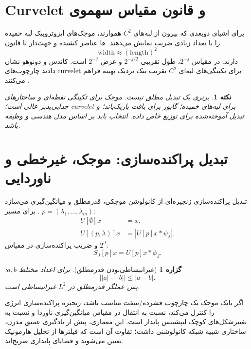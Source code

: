 \documentclass[12pt,openany,oneside]{book}
\newtheorem{proposition}{گزاره}[chapter]
\newtheorem{remark}{نکته}[chapter]
\begin{document}
\section{Curvelet و قانون مقیاس سهموی}

برای اشیای دوبعدی که بیرون از لبه‌های \(C^2\) هموارند، موجک‌های ایزوتروپیک لبه خمیده را با تعداد زیادی
ضریب نمایش می‌دهند. ها عناصر کشیده و جهت‌دار با قانون
\begin{equation}
\text{width}\approx(\text{length})^2
\end{equation}
دارند. در مقیاس \(2^{-j}\)، طول تقریبی \(2^{-j/2}\) و عرض \(2^{-j}\) است. کاندس و دونوهو نشان دادند
چارچوب‌های curvelet برای تکینگی‌های لبه‌ای \(C^2\) تقریب تنک نزدیک بهینه فراهم می‌کنند
\cite{candes2004curvelet}.

\begin{remark}
برتری یک تبدیل مطلق نیست. موجک برای تکینگی نقطه‌ای و ساختارهای جدایی‌پذیر عالی است؛ curvelet برای
لبه‌های خمیده؛ گابور برای بافت باریک‌باند؛ و تبدیل آموخته‌شده برای توزیع خاص داده. انتخاب باید بر اساس
مدل هندسی و وظیفه باشد.
\end{remark}

\section{تبدیل پراکنده‌سازی: موجک، غیرخطی و ناوردایی}

تبدیل پراکنده‌سازی  زنجیره‌ای از کانولوشن موجکی، قدرمطلق و میانگین‌گیری می‌سازد
\cite{mallat2012scattering}. برای مسیر \(p=(\lambda_1,\dots,\lambda_m)\):
\begin{equation}
\begin{aligned}
U[\emptyset]x&=x,\\
U[(p,\lambda)]x&=\left|U[p]x*\psi_{\lambda}\right|.
\end{aligned}
\end{equation}
و ضریب پراکنده‌سازی در مقیاس \(2^J\):
\begin{equation}
S_J[p]x=U[p]x*\phi_J.
\end{equation}

\begin{proposition}[غیرانبساطی‌بودن قدرمطلق]
برای اعداد مختلط \(a,b\):
\begin{equation}
\big||a|-|b|\big|\le|a-b|.
\end{equation}
پس عملگر قدرمطلق در \(L^2\) غیرانبساطی است.
\end{proposition}

اگر بانک موجک یک چارچوب فشرده/سفت مناسب باشد، زنجیره پراکنده‌سازی انرژی را کنترل می‌کند، نسبت به انتقال
در مقیاس میانگین‌گیری ناوردا و نسبت به تغییرشکل‌های کوچک لیپشیتس پایدار است. این معماری، پیش از یادگیری
عمیق مدرن، ساختاری شبیه شبکه کانولوشنی داشت؛ تفاوت آن است که فیلترها از تحلیل هارمونیک تعیین می‌شوند و
قضایای پایداری صریح‌اند.
\end{document}
